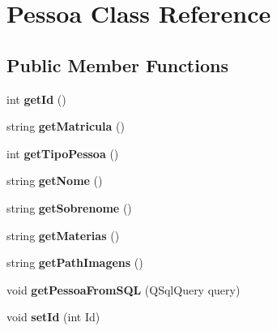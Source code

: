 \hypertarget{classPessoa}{}\section{Pessoa Class Reference}
\label{classPessoa}
\subsection*{Public Member Functions}
\begin{DoxyCompactItemize}
\item 
int {\bfseries get\+Id} ()\hypertarget{classPessoa_a6699a108d29ebc18cb06c10f3a44c330}{}\label{classPessoa_a6699a108d29ebc18cb06c10f3a44c330}

\item 
string {\bfseries get\+Matricula} ()\hypertarget{classPessoa_a338f9b529bf8a78edfd5515616353a3c}{}\label{classPessoa_a338f9b529bf8a78edfd5515616353a3c}

\item 
int {\bfseries get\+Tipo\+Pessoa} ()\hypertarget{classPessoa_aec72363ec6bf17739cbda8f13af440a7}{}\label{classPessoa_aec72363ec6bf17739cbda8f13af440a7}

\item 
string {\bfseries get\+Nome} ()\hypertarget{classPessoa_aedeca9c83ea13db9c487ceb48ac37da7}{}\label{classPessoa_aedeca9c83ea13db9c487ceb48ac37da7}

\item 
string {\bfseries get\+Sobrenome} ()\hypertarget{classPessoa_acba657deef9c9aecd55eac2cbb61ffd6}{}\label{classPessoa_acba657deef9c9aecd55eac2cbb61ffd6}

\item 
string {\bfseries get\+Materias} ()\hypertarget{classPessoa_aa0600391a39d2f27e680952f1a4172ab}{}\label{classPessoa_aa0600391a39d2f27e680952f1a4172ab}

\item 
string {\bfseries get\+Path\+Imagens} ()\hypertarget{classPessoa_a5b7bac17898a7e2d81768a980aaae1c0}{}\label{classPessoa_a5b7bac17898a7e2d81768a980aaae1c0}

\item 
void {\bfseries get\+Pessoa\+From\+S\+QL} (Q\+Sql\+Query query)\hypertarget{classPessoa_a719cbc182279b895fe156fc66cf99d00}{}\label{classPessoa_a719cbc182279b895fe156fc66cf99d00}

\item 
void {\bfseries set\+Id} (int Id)\hypertarget{classPessoa_ace040b980db8e6528e4c14db3e65c359}{}\label{classPessoa_ace040b980db8e6528e4c14db3e65c359}


\end{DoxyCompactItemize}
